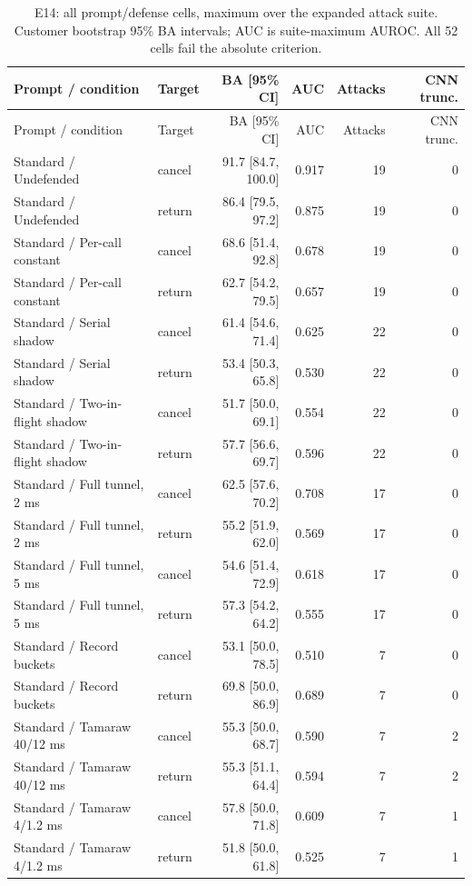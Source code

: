 \begin{longtable}{@{}llrrrr@{}}
\caption{E14: all prompt/defense cells, maximum over the expanded attack suite. Customer bootstrap 95\% BA intervals; AUC is suite-maximum AUROC. All 52 cells fail the absolute criterion.}\label{tab:r7-all}\\
\toprule Prompt / condition & Target & BA [95\% CI] & AUC & Attacks & CNN trunc.\\\midrule\endfirsthead
\toprule Prompt / condition & Target & BA [95\% CI] & AUC & Attacks & CNN trunc.\\\midrule\endhead
Standard / Undefended & cancel & 91.7 [84.7, 100.0] & 0.917 & 19 & 0\\
Standard / Undefended & return & 86.4 [79.5, 97.2] & 0.875 & 19 & 0\\
Standard / Per-call constant & cancel & 68.6 [51.4, 92.8] & 0.678 & 19 & 0\\
Standard / Per-call constant & return & 62.7 [54.2, 79.5] & 0.657 & 19 & 0\\
Standard / Serial shadow & cancel & 61.4 [54.6, 71.4] & 0.625 & 22 & 0\\
Standard / Serial shadow & return & 53.4 [50.3, 65.8] & 0.530 & 22 & 0\\
Standard / Two-in-flight shadow & cancel & 51.7 [50.0, 69.1] & 0.554 & 22 & 0\\
Standard / Two-in-flight shadow & return & 57.7 [56.6, 69.7] & 0.596 & 22 & 0\\
Standard / Full tunnel, 2 ms & cancel & 62.5 [57.6, 70.2] & 0.708 & 17 & 0\\
Standard / Full tunnel, 2 ms & return & 55.2 [51.9, 62.0] & 0.569 & 17 & 0\\
Standard / Full tunnel, 5 ms & cancel & 54.6 [51.4, 72.9] & 0.618 & 17 & 0\\
Standard / Full tunnel, 5 ms & return & 57.3 [54.2, 64.2] & 0.555 & 17 & 0\\
Standard / Record buckets & cancel & 53.1 [50.0, 78.5] & 0.510 & 7 & 0\\
Standard / Record buckets & return & 69.8 [50.0, 86.9] & 0.689 & 7 & 0\\
Standard / Tamaraw 40/12 ms & cancel & 55.3 [50.0, 68.7] & 0.590 & 7 & 2\\
Standard / Tamaraw 40/12 ms & return & 55.3 [51.1, 64.4] & 0.594 & 7 & 2\\
Standard / Tamaraw 4/1.2 ms & cancel & 57.8 [50.0, 71.8] & 0.609 & 7 & 1\\
Standard / Tamaraw 4/1.2 ms & return & 51.8 [50.0, 61.8] & 0.525 & 7 & 1\\

\end{longtable}
